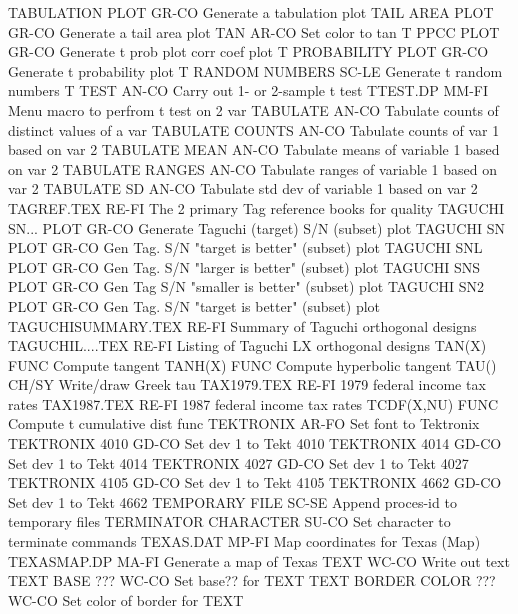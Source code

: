 TABULATION PLOT             GR-CO Generate a tabulation plot
TAIL AREA PLOT              GR-CO Generate a tail area plot
TAN                         AR-CO Set color to tan
T PPCC PLOT                 GR-CO Generate t prob plot corr coef plot
T PROBABILITY PLOT          GR-CO Generate t probability plot
T RANDOM NUMBERS            SC-LE Generate t random numbers
T TEST                      AN-CO Carry out 1- or 2-sample t test
TTEST.DP                    MM-FI Menu macro to perfrom t test on 2 var
TABULATE                    AN-CO Tabulate counts of distinct values of a var
TABULATE COUNTS             AN-CO Tabulate counts of var 1 based on var 2
TABULATE MEAN               AN-CO Tabulate means of variable 1 based on var 2
TABULATE RANGES             AN-CO Tabulate ranges of variable 1 based on var 2
TABULATE SD                 AN-CO Tabulate std dev of variable 1 based on var 2
TAGREF.TEX                  RE-FI The 2 primary Tag reference books for quality
TAGUCHI SN... PLOT          GR-CO Generate Taguchi (target) S/N (subset) plot
TAGUCHI SN PLOT             GR-CO Gen Tag. S/N "target is better" (subset) plot
TAGUCHI SNL PLOT            GR-CO Gen Tag. S/N "larger is better" (subset) plot
TAGUCHI SNS PLOT            GR-CO Gen Tag S/N "smaller is better" (subset) plot
TAGUCHI SN2 PLOT            GR-CO Gen Tag. S/N "target is better" (subset) plot
TAGUCHISUMMARY.TEX          RE-FI Summary of Taguchi orthogonal designs
TAGUCHIL....TEX             RE-FI Listing of Taguchi LX orthogonal designs
TAN(X)                      FUNC  Compute tangent
TANH(X)                     FUNC  Compute hyperbolic tangent
TAU()                       CH/SY Write/draw Greek tau
TAX1979.TEX                 RE-FI 1979 federal income tax rates
TAX1987.TEX                 RE-FI 1987 federal income tax rates
TCDF(X,NU)                  FUNC  Compute t cumulative dist func
TEKTRONIX                   AR-FO Set font to Tektronix
TEKTRONIX 4010              GD-CO Set dev 1 to Tekt 4010
TEKTRONIX 4014              GD-CO Set dev 1 to Tekt 4014
TEKTRONIX 4027              GD-CO Set dev 1 to Tekt 4027
TEKTRONIX 4105              GD-CO Set dev 1 to Tekt 4105
TEKTRONIX 4662              GD-CO Set dev 1 to Tekt 4662
TEMPORARY FILE              SC-SE Append proces-id to temporary files
TERMINATOR CHARACTER        SU-CO Set character to terminate commands
TEXAS.DAT                   MP-FI Map coordinates for Texas (Map)
TEXASMAP.DP                 MA-FI Generate a map of Texas
TEXT                        WC-CO Write out text
TEXT BASE              ???  WC-CO Set base?? for TEXT
TEXT BORDER COLOR      ???  WC-CO Set color of border for TEXT
